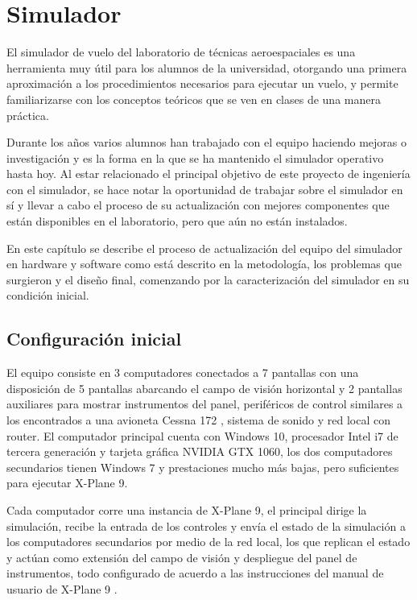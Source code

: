 \chapter{Simulador}

El simulador de vuelo del laboratorio de técnicas aeroespaciales es una herramienta muy útil para los alumnos de la universidad, otorgando una primera aproximación a los procedimientos necesarios para ejecutar un vuelo, y permite familiarizarse con los conceptos teóricos que se ven en clases de una manera práctica.

Durante los años varios alumnos han trabajado con el equipo haciendo mejoras o investigación y es la forma en la que se ha mantenido el simulador operativo hasta hoy. Al estar relacionado el principal objetivo de este proyecto de ingeniería con el simulador, se hace notar la oportunidad de trabajar sobre el simulador en sí y llevar a cabo el proceso de su actualización con mejores componentes que están disponibles en el laboratorio, pero que aún no están instalados.

En este capítulo se describe el proceso de actualización del equipo del simulador en hardware y software como está descrito en la metodología, los problemas que surgieron y el diseño final, comenzando por la caracterización del simulador en su condición inicial.

\section{Configuración inicial}

El equipo consiste en 3 computadores conectados a 7 pantallas con una disposición de 5 pantallas abarcando el campo de visión horizontal y 2 pantallas auxiliares para mostrar instrumentos del panel, periféricos de control similares a los encontrados a una avioneta Cessna 172 \cite{saitek}, sistema de sonido y red local con router. El computador principal cuenta con Windows 10, procesador Intel i7 de tercera generación y tarjeta gráfica NVIDIA GTX 1060, los dos computadores secundarios tienen Windows 7 y prestaciones mucho más bajas, pero suficientes para ejecutar X-Plane 9.

Cada computador corre una instancia de X-Plane 9, el principal dirige la simulación, recibe la entrada de los controles y envía el estado de la simulación a los computadores secundarios por medio de la red local, los que replican el estado y actúan como extensión del campo de visión y despliegue del panel de instrumentos, todo configurado de acuerdo a las instrucciones del manual de usuario de X-Plane 9 \cite{manual9}.

